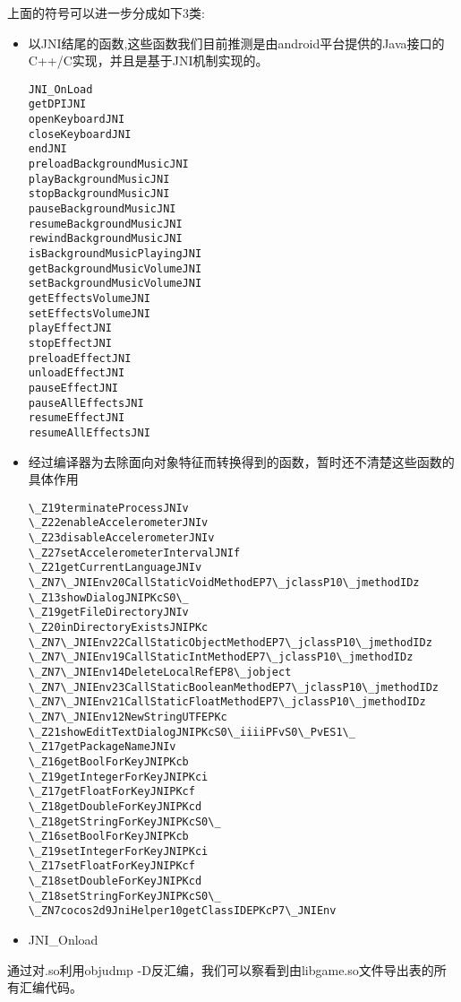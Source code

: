 上面的符号可以进一步分成如下3类:
\begin{itemize}
\item 以JNI结尾的函数,这些函数我们目前推测是由android平台提供的Java接口的C++/C实现，并且是基于JNI机制实现的。
\begin{lstlisting}
JNI_OnLoad
getDPIJNI
openKeyboardJNI
closeKeyboardJNI
endJNI
preloadBackgroundMusicJNI
playBackgroundMusicJNI
stopBackgroundMusicJNI
pauseBackgroundMusicJNI
resumeBackgroundMusicJNI
rewindBackgroundMusicJNI
isBackgroundMusicPlayingJNI
getBackgroundMusicVolumeJNI
setBackgroundMusicVolumeJNI
getEffectsVolumeJNI
setEffectsVolumeJNI
playEffectJNI
stopEffectJNI
preloadEffectJNI
unloadEffectJNI
pauseEffectJNI
pauseAllEffectsJNI
resumeEffectJNI
resumeAllEffectsJNI
\end{lstlisting}
\item 经过编译器为去除面向对象特征而转换得到的函数，暂时还不清楚这些函数的具体作用
\begin{lstlisting}
\_Z19terminateProcessJNIv
\_Z22enableAccelerometerJNIv
\_Z23disableAccelerometerJNIv
\_Z27setAccelerometerIntervalJNIf
\_Z21getCurrentLanguageJNIv
\_ZN7\_JNIEnv20CallStaticVoidMethodEP7\_jclassP10\_jmethodIDz
\_Z13showDialogJNIPKcS0\_
\_Z19getFileDirectoryJNIv
\_Z20inDirectoryExistsJNIPKc
\_ZN7\_JNIEnv22CallStaticObjectMethodEP7\_jclassP10\_jmethodIDz
\_ZN7\_JNIEnv19CallStaticIntMethodEP7\_jclassP10\_jmethodIDz
\_ZN7\_JNIEnv14DeleteLocalRefEP8\_jobject
\_ZN7\_JNIEnv23CallStaticBooleanMethodEP7\_jclassP10\_jmethodIDz
\_ZN7\_JNIEnv21CallStaticFloatMethodEP7\_jclassP10\_jmethodIDz
\_ZN7\_JNIEnv12NewStringUTFEPKc
\_Z21showEditTextDialogJNIPKcS0\_iiiiPFvS0\_PvES1\_
\_Z17getPackageNameJNIv
\_Z16getBoolForKeyJNIPKcb
\_Z19getIntegerForKeyJNIPKci
\_Z17getFloatForKeyJNIPKcf
\_Z18getDoubleForKeyJNIPKcd
\_Z18getStringForKeyJNIPKcS0\_
\_Z16setBoolForKeyJNIPKcb
\_Z19setIntegerForKeyJNIPKci
\_Z17setFloatForKeyJNIPKcf
\_Z18setDoubleForKeyJNIPKcd
\_Z18setStringForKeyJNIPKcS0\_
\_ZN7cocos2d9JniHelper10getClassIDEPKcP7\_JNIEnv
\end{lstlisting}
\item JNI\_Onload
\end{itemize}

通过对.so利用objudmp -D反汇编，我们可以察看到由libgame.so文件导出表的所有汇编代码。

